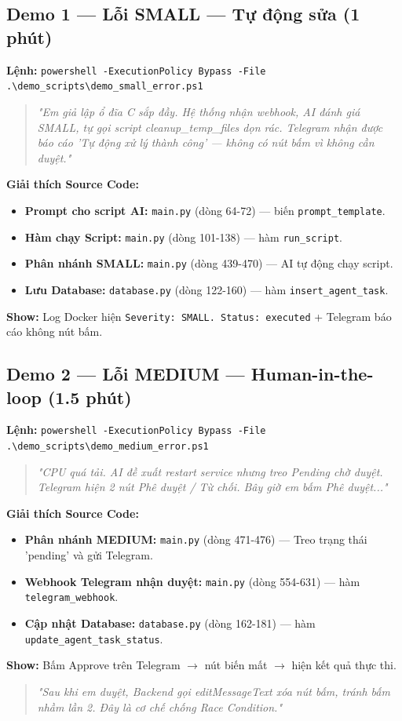 \documentclass[12pt,a4paper]{article}
\begin{document}
\subsection{Demo 1 — Lỗi SMALL — Tự động sửa (1 phút)}
\textbf{Lệnh:} \texttt{powershell -ExecutionPolicy Bypass -File .\textbackslash{}demo\_scripts\textbackslash{}demo\_small\_error.ps1}
\begin{quote}
    \textit{"Em giả lập ổ đĩa C sắp đầy. Hệ thống nhận webhook, AI đánh giá SMALL, tự gọi script cleanup\_temp\_files dọn rác. Telegram nhận được báo cáo 'Tự động xử lý thành công' — không có nút bấm vì không cần duyệt."}
\end{quote}
\textbf{Giải thích Source Code:}
\begin{itemize}
    \item \textbf{Prompt cho script AI:} \texttt{main.py} (dòng 64-72) — biến \texttt{prompt\_template}.
    \item \textbf{Hàm chạy Script:} \texttt{main.py} (dòng 101-138) — hàm \texttt{run\_script}.
    \item \textbf{Phân nhánh SMALL:} \texttt{main.py} (dòng 439-470) — AI tự động chạy script.
    \item \textbf{Lưu Database:} \texttt{database.py} (dòng 122-160) — hàm \texttt{insert\_agent\_task}.
\end{itemize}
\textbf{Show:} Log Docker hiện \texttt{Severity: SMALL. Status: executed} + Telegram báo cáo không nút bấm.

\subsection{Demo 2 — Lỗi MEDIUM — Human-in-the-loop (1.5 phút)}
\textbf{Lệnh:} \texttt{powershell -ExecutionPolicy Bypass -File .\textbackslash{}demo\_scripts\textbackslash{}demo\_medium\_error.ps1}
\begin{quote}
    \textit{"CPU quá tải. AI đề xuất restart service nhưng treo Pending chờ duyệt. Telegram hiện 2 nút Phê duyệt / Từ chối. Bây giờ em bấm Phê duyệt..."}
\end{quote}
\textbf{Giải thích Source Code:}
\begin{itemize}
    \item \textbf{Phân nhánh MEDIUM:} \texttt{main.py} (dòng 471-476) — Treo trạng thái 'pending' và gửi Telegram.
    \item \textbf{Webhook Telegram nhận duyệt:} \texttt{main.py} (dòng 554-631) — hàm \texttt{telegram\_webhook}.
    \item \textbf{Cập nhật Database:} \texttt{database.py} (dòng 162-181) — hàm \texttt{update\_agent\_task\_status}.
\end{itemize}
\textbf{Show:} Bấm Approve trên Telegram $\rightarrow$ nút biến mất $\rightarrow$ hiện kết quả thực thi.
\begin{quote}
    \textit{"Sau khi em duyệt, Backend gọi editMessageText xóa nút bấm, tránh bấm nhầm lần 2. Đây là cơ chế chống Race Condition."}
\end{quote}
\end{document}
